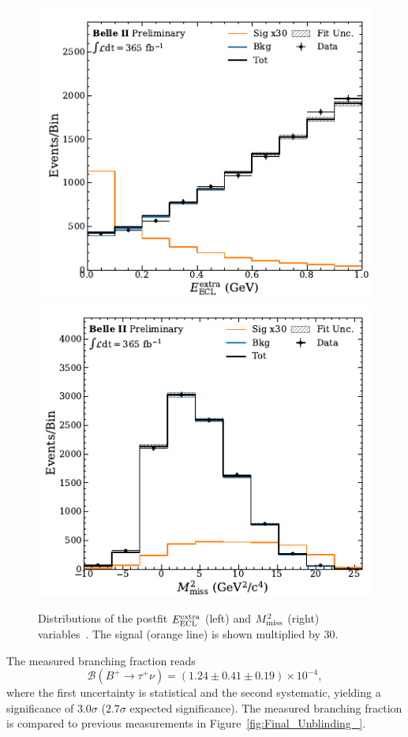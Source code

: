 \documentclass{moriond}
\def\eecl{E_{\rm ECL}^{\rm extra}}
\def\mmiss{M_{\rm miss}^2}
\begin{document}
\begin{figure}[h!]
    \centering
    \includegraphics[scale=0.8]{Figures/eeclextra.pdf}
    \includegraphics[scale=0.8]{Figures/mmiss.pdf}
    \caption{Distributions of the postfit $\eecl$ (left) and $\mmiss$ (right) variables~\cite{gio}. The signal (orange line) is shown multiplied by 30.}
    \label{fig:gio_distributions}
\end{figure}
The measured branching fraction reads
\begin{equation}
    \mathcal{B}(B^+ \to \tau^+\nu) = (1.24 \pm 0.41 \pm 0.19)\times 10^{-4},
\end{equation}
where the first uncertainty is statistical and the second systematic, yielding a significance of $3.0\sigma$ ($2.7\sigma$ expected significance). The measured branching fraction is compared to previous measurements  in Figure~\ref{fig:Final_Unblinding_}.
\end{document}
